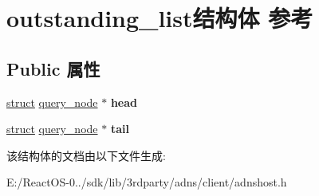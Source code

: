 \hypertarget{structoutstanding__list}{}\section{outstanding\+\_\+list结构体 参考}
\label{structoutstanding__list}
\subsection*{Public 属性}
\begin{DoxyCompactItemize}
\item 
\mbox{\label{structoutstanding__list_a1edf753d680fdc65696cb7d6755b248e}} 
\hyperlink{interfacestruct}{struct} \hyperlink{structquery__node}{query\+\_\+node} $\ast$ {\bfseries head}
\item 
\mbox{\label{structoutstanding__list_a40a28f0f87d7c341a7c49374de47678e}} 
\hyperlink{interfacestruct}{struct} \hyperlink{structquery__node}{query\+\_\+node} $\ast$ {\bfseries tail}
\end{DoxyCompactItemize}


该结构体的文档由以下文件生成\+:\begin{DoxyCompactItemize}
\item 
E\+:/\+React\+O\+S-\/0../sdk/lib/3rdparty/adns/client/adnshost.\+h\end{DoxyCompactItemize}
